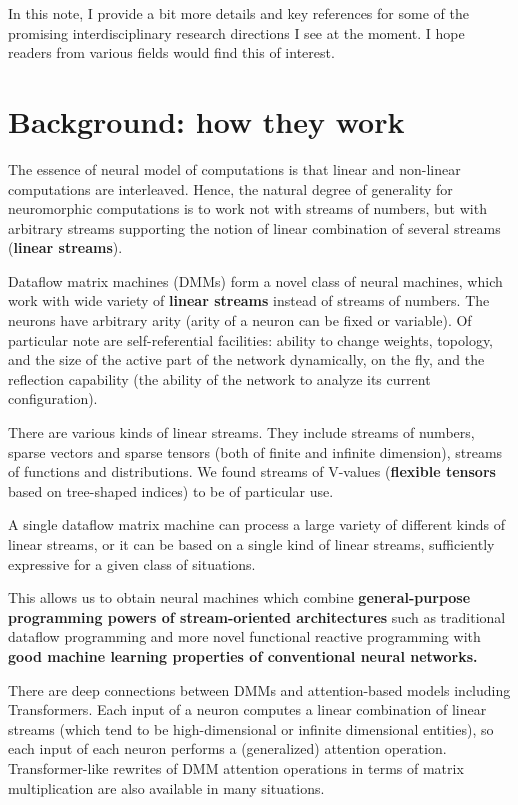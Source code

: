\documentclass{article}
\begin{document}
In this note, I provide a bit more details and key references for some of the promising
interdisciplinary research directions I see at the moment. I hope readers from various
fields would find this of interest.

\vspace{-0.2in}

\tableofcontents

\section{Background: how they work}

The essence of neural model of computations is that linear and non-linear computations are interleaved. Hence, the natural
degree of generality for neuromorphic computations is to work not with streams of numbers, but with arbitrary streams
supporting the notion of linear combination of several streams ({\bf linear streams}).

Dataflow matrix machines (DMMs) form a novel class of neural machines, which work with wide variety
of {\bf linear streams} instead of streams of numbers. The neurons have
arbitrary arity (arity of a neuron can be fixed or variable). Of particular note are
self-referential facilities: ability to change weights, topology, and the size of the active part of the network dynamically, on the fly,
and the reflection capability (the ability of the network to analyze its current configuration).

There are various kinds of linear streams. They include streams of numbers, sparse vectors and sparse tensors (both of
finite and infinite dimension), streams of functions and distributions. We found streams of V-values
({\bf flexible tensors} based on tree-shaped indices) to be of particular use.

A single dataflow matrix machine can process a large variety of different kinds of linear streams, or
it can be based on a single kind of linear streams, sufficiently expressive for a given class of situations.

This allows us to obtain 
neural machines which combine {\bf general-purpose programming powers of stream-oriented
architectures} such as traditional dataflow programming and
more novel functional reactive programming with {\bf good machine learning
properties of conventional neural networks.}

There are deep connections between DMMs and attention-based models including Transformers.
Each input of a neuron computes a linear combination of linear streams (which tend to be high-dimensional
or infinite dimensional entities), so each input of each neuron performs a (generalized) attention operation.
Transformer-like rewrites of DMM attention operations in terms of matrix multiplication are also available in many situations.
\end{document}
